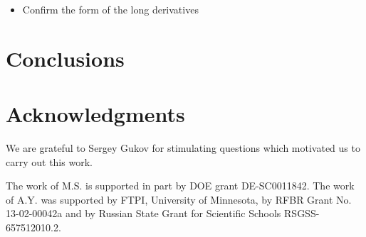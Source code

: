 \documentclass[epsfig,12pt]{article}
\begin{document}
\pagebreak
\begin{itemize}
\item
	Confirm the form of the long derivatives
\end{itemize}

\section{Conclusions}


\section*{Acknowledgments}

We are grateful to Sergey Gukov for stimulating questions  which motivated us to carry out this work.

	The work  of M.S. is supported in part by DOE grant DE-SC0011842. 
	The work of A.Y. was  supported 
	by  FTPI, University of Minnesota, 
	by RFBR Grant No. 13-02-00042a 
	and by Russian State Grant for 
	Scientific Schools RSGSS-657512010.2.


\newpage
\appendix
\end{document}

